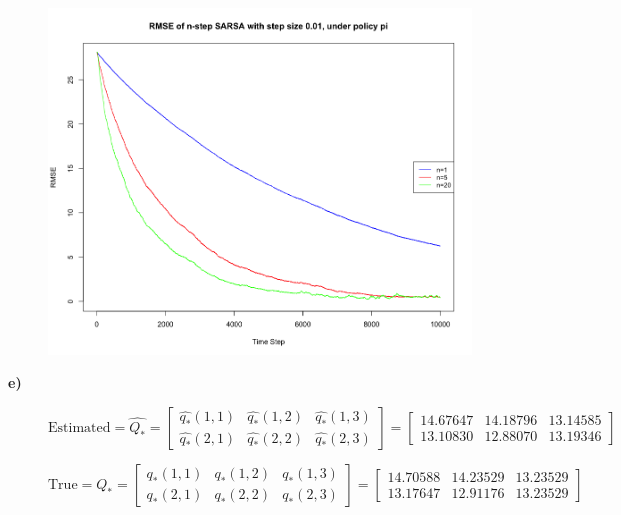 \documentclass[a4paper,12pt]{article}
\begin{document}
\begin{figure}[H]
  \centering
  \includegraphics[width=14cm]{figures/1d.png}
\end{figure}

\textbf{e)} 

\begin{figure}[ht]
  \centering
    $\text{Estimated} = \hat{Q_{*}} =
    \begin{bmatrix}
      \hat{q_{*}}(1, 1) & \hat{q_{*}}(1, 2) & \hat{q_{*}}(1, 3) \\
      \hat{q_{*}}(2, 1) & \hat{q_{*}}(2, 2) & \hat{q_{*}}(2, 3)
    \end{bmatrix}   =  
    \begin{bmatrix}
      14.67647 & 14.18796 & 13.14585 \\
      13.10830 & 12.88070 & 13.19346
    \end{bmatrix}$      
\end{figure}

\begin{figure}[ht]
  \centering
    $\text{True} = Q_{*} =  
    \begin{bmatrix}
      {q_{*}}(1, 1) & {q_{*}}(1, 2) & {q_{*}}(1, 3) \\
      {q_{*}}(2, 1) & {q_{*}}(2, 2) & {q_{*}}(2, 3)
    \end{bmatrix}   =  
    \begin{bmatrix}
      14.70588 & 14.23529 & 13.23529 \\
      13.17647 & 12.91176 & 13.23529
    \end{bmatrix}$      
\end{figure}
\end{document}
